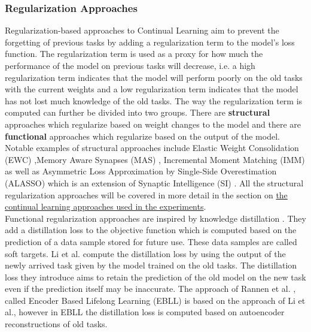\subsubsection{Regularization Approaches}
\label{sec:RegularizationApproaches}
Regularization-based approaches to Continual Learning aim to prevent the forgetting of previous tasks by adding a regularization
term to the model's loss function. The regularization term is used as a proxy for how much the performance of the model on previous
tasks will decrease, i.e. a high regularization term indicates that the model will perform poorly on the old tasks with the current
weights and a low regularization term indicates that the model has not lost much knowledge of the old tasks. The way the
regularization term is computed can further be divided into two groups. There are \textbf{structural} approaches which regularize
based on weight changes to the model and there are \textbf{functional} approaches which regularize based on the output of the model.
Notable examples of structural approaches include Elastic Weight Consolidation (EWC) \cite{kirkpatrick2017overcoming},Memory Aware
Synapses (MAS) \cite{aljundi2018memory}, Incremental Moment Matching (IMM) \cite{lee2017overcoming} as well as Asymmetric Loss
Approximation by Single-Side Overestimation (ALASSO) \cite{park2019continual} which is an extension of Synaptic Intelligence (SI)
\cite{zenke2017continual}. All the structural regularization approaches will be covered in more detail in the section on
\href{sec:Related_work:Continual_Learning:Experiments}{the continual learning approaches used in the experiments}. \\
Functional regularization approaches are inspired by knowledge distillation \cite{hinton2015distilling}. They add a distillation
loss to the objective function which is computed based on the prediction of a data sample stored for future use. These data samples
are called soft targets. Li et al. \cite{li2017learning} compute the distillation loss by using the output of the newly arrived task
given by the model trained on the old tasks. The distillation loss they introduce aims to retain the prediction of the old model on
the new task even if the prediction itself may be inaccurate. The approach of Rannen et al. \cite{rannen2017encoder}, called Encoder
Based Lifelong Learning (EBLL) is based on the approach of Li et al., however in EBLL the distillation loss is computed based on
autoencoder reconstructions of old tasks.

